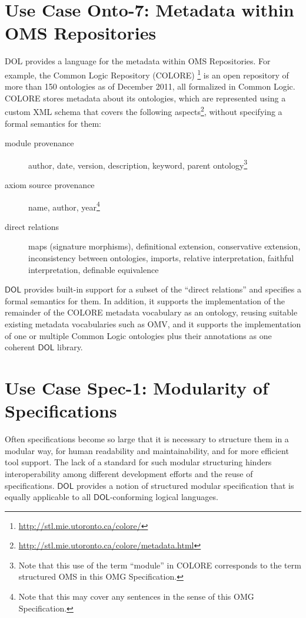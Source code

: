 \documentclass[10pt,fleqn,final]{scrreprt}
\newcommand*{\termref}[1]{\index{#1}#1\xspace}
\newcommand*{\IS}{OMG Specification\xspace}
\newcommand*{\DOL}{\ensuremath{\mathsf{DOL}}\xspace}
\newenvironment{definitions}[0]{\medskip }{}
\begin{document}
\begin{definitions}
\section{Use Case Onto-7: Metadata within OMS Repositories}
DOL provides a language for the metadata within OMS Repositories. 
For example, the Common Logic Repository (COLORE) \footnote{\url{http://stl.mie.utoronto.ca/colore/}} is an open 
repository of more than 150 ontologies as of December 2011, all formalized in Common Logic. 
COLORE  stores metadata about its ontologies, which are represented using a custom XML schema that 
covers the following aspects\footnote{\url{http://stl.mie.utoronto.ca/colore/metadata.html}}, 
without specifying a formal semantics for them:
  \begin{description}
  \item[module provenance] author, date, version, description, keyword, parent 
ontology\footnote{Note that this use of the term ``module'' in COLORE corresponds
to the term \termref{structured OMS} in this \IS{}.}
  \item[axiom source provenance] name, author, year\footnote{Note that this may cover any 
   sentences in the sense of this \IS{}.}
  \item[direct relations] maps (signature morphisms), definitional extension, conservative 
   extension, inconsistency between ontologies, imports, relative interpretation, faithful 
interpretation, definable equivalence
  \end{description}

  \DOL provides built-in support for a subset of the ``direct relations'' and specifies a formal 
semantics for them.  In addition, it supports the implementation of  the remainder of the COLORE 
metadata vocabulary as an ontology, reusing suitable existing metadata vocabularies such as OMV, 
and it supports the implementation of one or multiple Common Logic ontologies plus their 
annotations as one coherent \DOL library.





\section{Use Case Spec-1: Modularity of Specifications}\label{spec-1}
Often specifications become so large that it is necessary to structure
them in a modular way, for human readability and maintainability, and for more efficient tool support. The lack of a standard for such
modular structuring hinders interoperability among different
development efforts and the reuse of specifications.  \DOL provides a
notion of structured modular specification that is equally applicable
to all \DOL-conforming logical languages.


\end{definitions}
\end{document}
